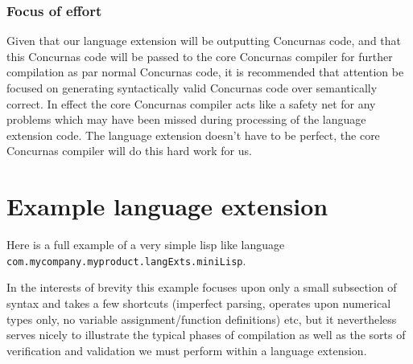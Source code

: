 \documentclass[conc-doc]{subfiles}
\begin{document}
\subsubsection{Focus of effort}
Given that our language extension will be outputting Concurnas code, and that this Concurnas code will be passed to the core Concurnas compiler for further compilation as par normal Concurnas code, it is recommended that attention be focused on generating syntactically valid Concurnas code over semantically correct. In effect the core Concurnas compiler acts like a safety net for any problems which may have been missed during processing of the language extension code. The language extension doesn't have to be perfect, the core Concurnas compiler will do this hard work for us.


\section{Example language extension}
Here is a full example of a very simple lisp like language \lstinline{com.mycompany.myproduct.langExts.miniLisp}.

In the interests of brevity this example focuses upon only a small subsection of syntax and takes a few shortcuts (imperfect parsing, operates upon numerical types only, no variable assignment/function definitions) etc, but it nevertheless serves nicely to illustrate the typical phases of compilation as well as the sorts of verification and validation we must perform within a language extension.
\end{document}
